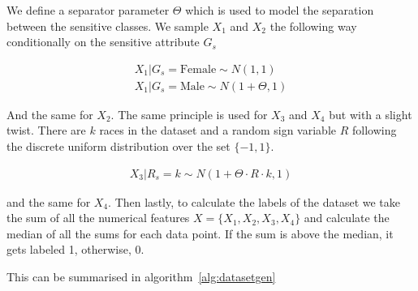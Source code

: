 We define a separator parameter $\Theta$ which is used to model the separation between the sensitive classes. We sample $X_1$ and $X_2$ the following way conditionally on the sensitive attribute $G_s$

\begin{equation*}
    \begin{aligned}
           X_1 | G_s = \text{Female} \sim N(1, 1) \\ 
           X_1 | G_s = \text{Male} \sim N(1 + \Theta, 1)
    \end{aligned}
\end{equation*}

And the same for $X_2$. The same principle is used for $X_3$ and $X_4$ but with a slight twist. There are $k$ races in the dataset and a random sign variable $R$ following the discrete uniform distribution over the set $\{-1, 1\}$.

\begin{equation*}
    \begin{aligned}
        X_3 | R_s = k \sim N(1 + \Theta \cdot R \cdot k, 1)
    \end{aligned}
\end{equation*}

and the same for $X_4$. Then lastly, to calculate the labels of the dataset we take the sum of all the numerical features $X = \{ X_1, X_2, X_3, X_4 \}$ and calculate the median of all the sums for each data point. If the sum is above the median, it gets labeled 1, otherwise, 0.

This can be summarised in algorithm~\ref{alg:datasetgen}

